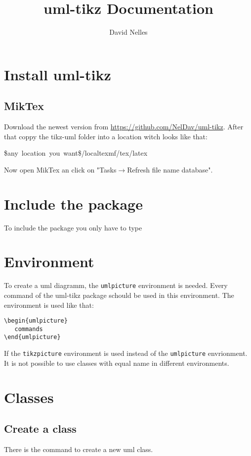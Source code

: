 \documentclass[parskip=full]{scrartcl}
\title{uml-tikz Documentation}
\author{David Nelles}
\begin{document}
	\maketitle
	\tableofcontents
	\newpage
	\section{Install uml-tikz}
		\subsection{MikTex}
		Download the newest version from \href{https://github.com/NelDav/uml-tikz}{https://github.com/NelDav/uml-tikz}. After that coppy the tikz-uml folder into a location witch looks like that:
		\begin{pathBox}
			\$any~location~you~want\$/localtexmf/tex/latex
		\end{pathBox}
		Now open MikTex an click on "Tasks$\rightarrow$Refresh file name database".
%		
	\section{Include the package}
		To include the package you only have to type 
%		
	\section{Environment}
		To create a uml diagramm, the \texttt{umlpicture} environment is needed. Every command of the uml-tikz package schould be used in this environment. The environment is used like that:
		
		\begin{lstlisting}
\begin{umlpicture}
   commands
\end{umlpicture}
		\end{lstlisting}
		
		\begin{attention}
			If the \texttt{tikzpicture} environment is used instead of the \texttt{umlpicture} envrionment. It is not possible to use classes with equal name in different environments.
		\end{attention}

	\section{Classes}
	
	\subsection{Create a class}
		There is the  command to create a new uml class.
		
\end{document}
